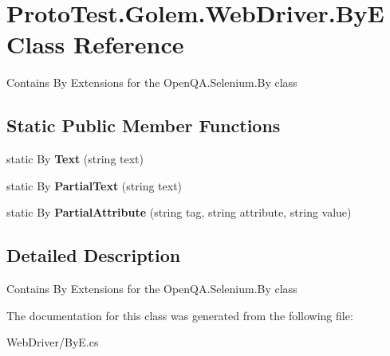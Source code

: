 \hypertarget{class_proto_test_1_1_golem_1_1_web_driver_1_1_by_e}{\section{Proto\-Test.\-Golem.\-Web\-Driver.\-By\-E Class Reference}
\label{class_proto_test_1_1_golem_1_1_web_driver_1_1_by_e}
}


Contains By Extensions for the Open\-Q\-A.\-Selenium.\-By class  


\subsection*{Static Public Member Functions}
\begin{DoxyCompactItemize}
\item 
\hypertarget{class_proto_test_1_1_golem_1_1_web_driver_1_1_by_e_a77b91459f89a7953a16ade3e31f4cb34}{static By {\bfseries Text} (string text)}\label{class_proto_test_1_1_golem_1_1_web_driver_1_1_by_e_a77b91459f89a7953a16ade3e31f4cb34}

\item 
\hypertarget{class_proto_test_1_1_golem_1_1_web_driver_1_1_by_e_a5ce7f902e0f0ac5402c3d9ca98f8a886}{static By {\bfseries Partial\-Text} (string text)}\label{class_proto_test_1_1_golem_1_1_web_driver_1_1_by_e_a5ce7f902e0f0ac5402c3d9ca98f8a886}

\item 
\hypertarget{class_proto_test_1_1_golem_1_1_web_driver_1_1_by_e_a58757f5310c2470206f98597c3ad2af4}{static By {\bfseries Partial\-Attribute} (string tag, string attribute, string value)}\label{class_proto_test_1_1_golem_1_1_web_driver_1_1_by_e_a58757f5310c2470206f98597c3ad2af4}

\end{DoxyCompactItemize}


\subsection{Detailed Description}
Contains By Extensions for the Open\-Q\-A.\-Selenium.\-By class 



The documentation for this class was generated from the following file\-:\begin{DoxyCompactItemize}
\item 
Web\-Driver/By\-E.\-cs\end{DoxyCompactItemize}
